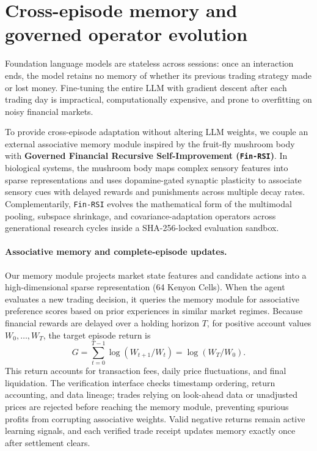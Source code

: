 \section{Cross-episode memory and governed operator evolution}
\label{sec:fly}
Foundation language models are stateless across sessions: once an interaction ends,
the model retains no memory of whether its previous trading strategy made or lost money.
Fine-tuning the entire LLM with gradient descent after each trading day is impractical,
computationally expensive, and prone to overfitting on noisy financial markets.

To provide cross-episode adaptation without altering LLM weights, we couple an external
associative memory module inspired by the fruit-fly mushroom body \cite{huang2024memory}
with \textbf{Governed Financial Recursive Self-Improvement (\texttt{Fin-RSI})}.
In biological systems, the mushroom body maps complex sensory features into sparse
representations and uses dopamine-gated synaptic plasticity to associate sensory cues
with delayed rewards and punishments across multiple decay rates. Complementarily,
\texttt{Fin-RSI} evolves the mathematical form of the multimodal pooling, subspace
shrinkage, and covariance-adaptation operators across generational research cycles inside
a SHA-256-locked evaluation sandbox.

\paragraph{Associative memory and complete-episode updates.}
Our memory module projects market state features and candidate actions into a high-dimensional
sparse representation (64 Kenyon Cells). When the agent evaluates a new trading decision, it
queries the memory module for associative preference scores based on prior experiences in similar
market regimes. Because financial rewards are delayed over a holding horizon $T$, for positive
account values $W_0,\ldots,W_T$, the target episode return is
\begin{equation}
G = \sum_{t=0}^{T-1}\log(W_{t+1}/W_t)
  = \log(W_T/W_0).
\end{equation}
This return accounts for transaction fees, daily price fluctuations, and final liquidation.
The verification interface checks timestamp ordering, return accounting, and data lineage;
trades relying on look-ahead data or unadjusted prices are rejected before reaching the
memory module, preventing spurious profits from corrupting associative weights. Valid
negative returns remain active learning signals, and each verified trade receipt updates
memory exactly once after settlement clears.

